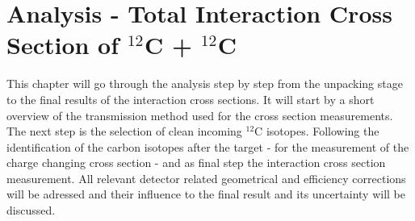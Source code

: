 \section{Analysis - Total Interaction Cross Section of  $^{12}$C + $^{12}$C}\label{sec:analysis_cross_sec}
This chapter will go through the  analysis step by step from the unpacking stage to the final results of the interaction cross sections. It will start by a short overview of the transmission method used for the cross section measurements. The next step is  the selection of clean incoming $^{12}$C isotopes. Following the identification of the carbon isotopes after the target - for the measurement of the charge changing cross section - and as final step the interaction cross section measurement. \newline
All relevant detector related geometrical and efficiency corrections will be adressed and their influence to the final result and its uncertainty will be discussed.
